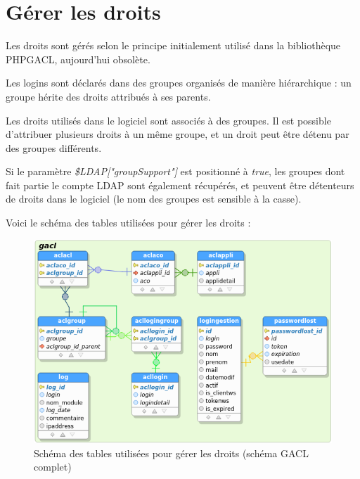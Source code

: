 \section{Gérer les droits}

Les droits sont gérés selon le principe initialement utilisé dans la bibliothèque PHPGACL, aujourd'hui obsolète. 

Les logins sont déclarés dans des groupes organisés de manière hiérarchique : un groupe hérite des droits attribués à ses parents.

Les droits utilisés dans le logiciel sont associés à des groupes. Il est possible d'attribuer plusieurs droits à un même groupe, et un droit peut être détenu par des groupes différents.

Si le paramètre \textit{\$LDAP["groupSupport"]} est positionné à \textit{true}, les groupes dont fait partie le compte LDAP sont également récupérés, et peuvent être détenteurs de droits dans le logiciel (le nom des groupes est sensible à la casse).

Voici le schéma des tables utilisées pour gérer les droits :

\begin{figure}[H]
\includegraphics[width=\linewidth]{dessin/gacl}
\caption{Schéma des tables utilisées pour gérer les droits (schéma GACL complet)}
\end{figure}

